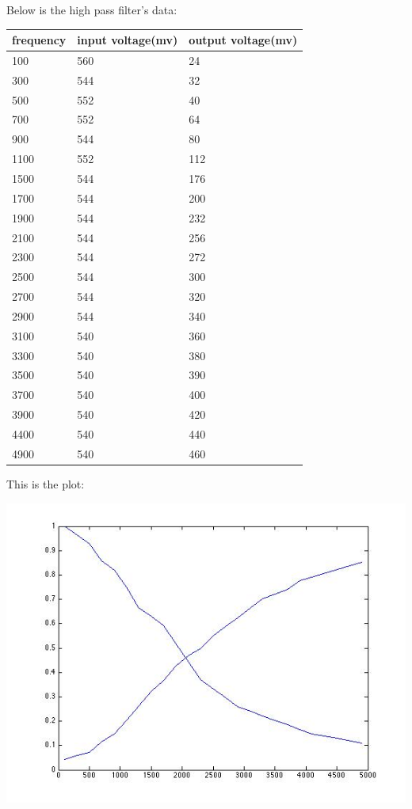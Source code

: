 \documentclass[11pt]{scrartcl}
\begin{document}
Below is the high pass filter's data:\\
\begin{center}
\begin{tabular}{|l|l|l|}
\hline
frequency&input voltage(mv)&output voltage(mv)\\\hline

100&560&24\\\hline
300&544&32\\\hline
500&552&40\\\hline
700&552&64\\\hline
900&544&80\\\hline
1100&552&112\\\hline
1500&544&176\\\hline
1700&544&200\\\hline
1900&544&232\\\hline
2100&544&256\\\hline
2300&544&272\\\hline
2500&544&300\\\hline
2700&544&320\\\hline
2900&544&340\\\hline
3100&540&360\\\hline
3300&540&380\\\hline
3500&540&390\\\hline
3700&540&400\\\hline
3900&540&420\\\hline
4400&540&440\\\hline
4900&540&460\\\hline
\end{tabular}

\end{center}

This is the plot:
\begin{center}
\begin{minipage}[t]{\linewidth}

{
\includegraphics[scale = 0.7]{cross.jpg}
}
\end{minipage}
\medskip
\end{center}
\end{document}
